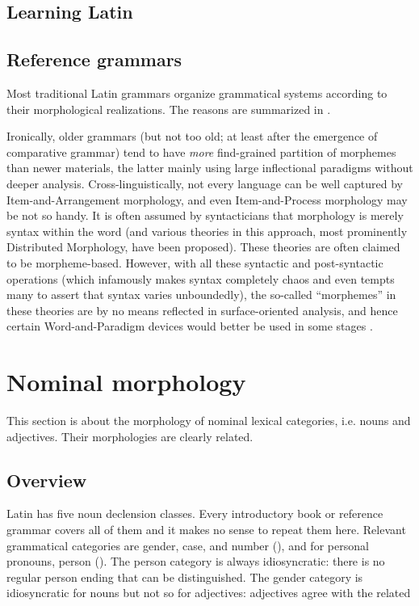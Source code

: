 \documentclass{article}
\begin{document}
\subsection{Learning Latin}

\subsection{Reference grammars}

Most traditional Latin grammars organize grammatical systems according to their morphological realizations.
The reasons are summarized in .

Ironically, older grammars (but not too old; at least after the emergence of comparative grammar)
tend to have \emph{more} find-grained partition of morphemes than newer materials,
the latter mainly using large inflectional paradigms without deeper analysis.
Cross-linguistically, not every language can be well captured by Item-and-Arrangement morphology,
and even Item-and-Process morphology may be not so handy.
It is often assumed by syntacticians that morphology is merely syntax within the word 
(and various theories in this approach, most prominently Distributed Morphology, have been proposed).
These theories are often claimed to be morpheme-based.
However, with all these syntactic and post-syntactic operations 
(which infamously makes syntax completely chaos and even tempts many to assert that syntax varies unboundedly),
the so-called ``morphemes'' in these theories are by no means reflected in surface-oriented analysis,
and hence certain Word-and-Paradigm devices would better be used in some stages \citep{anderson2017words}.

\section{Nominal morphology}\label{sec:nominal-morphology}

This section is about the morphology of nominal lexical categories, i.e. nouns and adjectives.
Their morphologies are clearly related.

\subsection{Overview}

Latin has five noun declension classes.
Every introductory book or reference grammar covers all of them and it makes no sense to repeat them here.
Relevant grammatical categories are gender, case, and number (), 
and for personal pronouns, person ().
The person category is always idiosyncratic:
there is no regular person ending that can be distinguished.
The gender category is idiosyncratic for nouns but not so for adjectives:
adjectives agree with the related %
\end{document}
